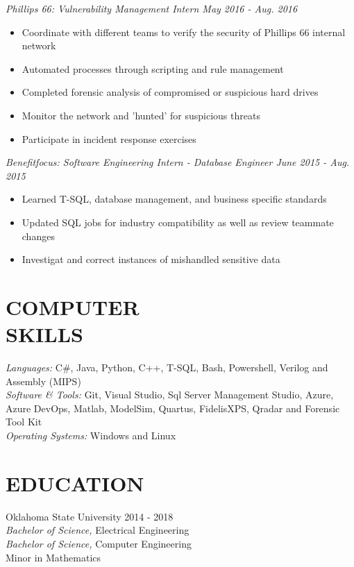 \documentclass[line,margin]{res}
\begin{document}
\begin{resume}
                 {\sl Phillips 66: Vulnerability Management Intern
                   \hfill        May 2016 - Aug. 2016}
                  \begin{itemize}
                  \item Coordinate with different teams to verify the security of
                    Phillips 66 internal network
                  \item Automated processes through scripting and rule management
                  \item Completed forensic analysis of compromised or suspicious
                    hard drives
                  \item Monitor the network and 'hunted' for suspicious threats
                  \item Participate in incident response exercises 
                  \end{itemize}

                  {\sl Benefitfocus: Software Engineering Intern - Database Engineer
                    \hfill        June 2015 - Aug. 2015}
                  \begin{itemize}
                  \item Learned T-SQL, database management, and business specific
                    standards
                  \item Updated SQL jobs for industry compatibility as well as review
                    teammate changes
                  \item Investigat and correct instances of mishandled sensitive data
                  \end{itemize}

\section{COMPUTER \\ SKILLS} {\sl Languages:} 
                C\#, Java, Python, C++, T-SQL, Bash, Powershell, Verilog and  Assembly (MIPS) \\
                {\sl Software \& Tools:}
                Git, Visual Studio, Sql Server Management Studio, Azure, Azure DevOps,
                Matlab, ModelSim, Quartus, FidelisXPS, Qradar and Forensic Tool Kit \\
                {\sl Operating Systems:} Windows and Linux
 
\section{EDUCATION} Oklahoma State University \hfill 2014 - 2018 \\
                        {\sl Bachelor of Science,} Electrical Engineering \\
                        {\sl Bachelor of Science,} Computer Engineering \\
                        Minor in Mathematics 



\end{resume}
\end{document}
